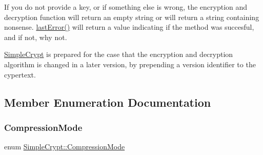 If you do not provide a key, or if something else is wrong, the encryption and decryption function will return an empty string or will return a string containing nonsense. \mbox{\hyperlink{class_simple_crypt_acb412b13386bf2bcb31552bc40949b39}{last\+Error()}} will return a value indicating if the method was succesful, and if not, why not.

\mbox{\hyperlink{class_simple_crypt}{Simple\+Crypt}} is prepared for the case that the encryption and decryption algorithm is changed in a later version, by prepending a version identifier to the cypertext. 

\subsection{Member Enumeration Documentation}
\mbox{\label{class_simple_crypt_a25298e746f175cf175a18f082092ca8e}} 
\subsubsection{\texorpdfstring{CompressionMode}{CompressionMode}}
{\footnotesize\ttfamily enum \mbox{\hyperlink{class_simple_crypt_a25298e746f175cf175a18f082092ca8e}{Simple\+Crypt\+::\+Compression\+Mode}}}


